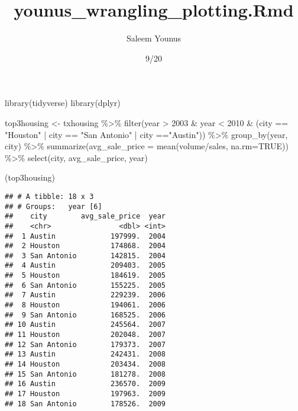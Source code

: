 \documentclass[
]{article}
\title{younus\_wrangling\_plotting.Rmd}
\author{Saleem Younus}
\date{9/20}
\newenvironment{Shaded}{\begin{snugshade}}{\end{snugshade}}
\newcommand{\AttributeTok}[1]{\textcolor[rgb]{0.77,0.63,0.00}{#1}}
\newcommand{\ConstantTok}[1]{\textcolor[rgb]{0.00,0.00,0.00}{#1}}
\newcommand{\DecValTok}[1]{\textcolor[rgb]{0.00,0.00,0.81}{#1}}
\newcommand{\FunctionTok}[1]{\textcolor[rgb]{0.00,0.00,0.00}{#1}}
\newcommand{\NormalTok}[1]{#1}
\newcommand{\OtherTok}[1]{\textcolor[rgb]{0.56,0.35,0.01}{#1}}
\newcommand{\SpecialCharTok}[1]{\textcolor[rgb]{0.00,0.00,0.00}{#1}}
\newcommand{\StringTok}[1]{\textcolor[rgb]{0.31,0.60,0.02}{#1}}
\begin{document}
\maketitle

\begin{Shaded}
\begin{Highlighting}[]
\FunctionTok{library}\NormalTok{(tidyverse)  }
\FunctionTok{library}\NormalTok{(dplyr)}
\end{Highlighting}
\end{Shaded}

\begin{Shaded}
\begin{Highlighting}[]
\NormalTok{top3housing }\OtherTok{\textless{}{-}}\NormalTok{ txhousing }\SpecialCharTok{\%\textgreater{}\%}
  \FunctionTok{filter}\NormalTok{(year }\SpecialCharTok{\textgreater{}} \DecValTok{2003} \SpecialCharTok{\&}\NormalTok{ year }\SpecialCharTok{\textless{}} \DecValTok{2010} \SpecialCharTok{\&}\NormalTok{ (city }\SpecialCharTok{==} \StringTok{"Houston"} \SpecialCharTok{|}\NormalTok{ city }\SpecialCharTok{==} \StringTok{"San Antonio"} \SpecialCharTok{|}\NormalTok{ city }\SpecialCharTok{==}\StringTok{"Austin"}\NormalTok{)) }\SpecialCharTok{\%\textgreater{}\%}
  \FunctionTok{group\_by}\NormalTok{(year, city) }\SpecialCharTok{\%\textgreater{}\%}
  \FunctionTok{summarize}\NormalTok{(}\AttributeTok{avg\_sale\_price =} \FunctionTok{mean}\NormalTok{(volume}\SpecialCharTok{/}\NormalTok{sales, }\AttributeTok{na.rm=}\ConstantTok{TRUE}\NormalTok{)) }\SpecialCharTok{\%\textgreater{}\%}
  \FunctionTok{select}\NormalTok{(city, avg\_sale\_price, year)}
  

\NormalTok{(top3housing)}
\end{Highlighting}
\end{Shaded}

\begin{verbatim}
## # A tibble: 18 x 3
## # Groups:   year [6]
##    city        avg_sale_price  year
##    <chr>                <dbl> <int>
##  1 Austin             197999.  2004
##  2 Houston            174868.  2004
##  3 San Antonio        142815.  2004
##  4 Austin             209403.  2005
##  5 Houston            184619.  2005
##  6 San Antonio        155225.  2005
##  7 Austin             229239.  2006
##  8 Houston            194061.  2006
##  9 San Antonio        168525.  2006
## 10 Austin             245564.  2007
## 11 Houston            202048.  2007
## 12 San Antonio        179373.  2007
## 13 Austin             242431.  2008
## 14 Houston            203434.  2008
## 15 San Antonio        181278.  2008
## 16 Austin             236570.  2009
## 17 Houston            197963.  2009
## 18 San Antonio        178526.  2009
\end{verbatim}
\end{document}
